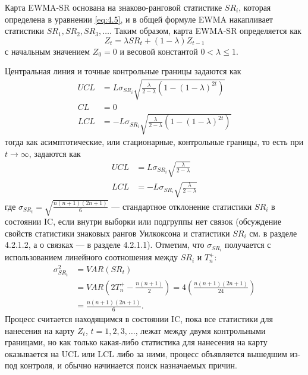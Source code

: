 Карта EWMA-SR основана на знаково-ранговой статистике \(SR_i\), которая определена в уравнении \eqref{eq:4.5}, и в общей формуле EWMA накапливает статистики \(SR_1, SR_2, SR_3, \ldots\). Таким образом, карта EWMA-SR определяется как
\begin{equation}
	Z_t = \lambda SR_t + (1 - \lambda) Z_{t-1}
	\label{eq:4.20}
\end{equation}
с начальным значением \(Z_0 = 0\) и весовой константой \(0 < \lambda \le 1\).

Центральная линия и точные контрольные границы задаются как
\begin{equation}
	\begin{aligned}
		UCL &= L\sigma_{SR_i}\sqrt{\frac{\lambda}{2 - \lambda} \left(1 - (1 - \lambda)^{2t}\right)} \\
		CL &= 0 \\
		LCL &= -L\sigma_{SR_i}\sqrt{\frac{\lambda}{2 - \lambda} \left(1 - (1 - \lambda)^{2t}\right)}
	\end{aligned}
	\label{eq:4.21}
\end{equation}
тогда как асимптотические, или стационарные, контрольные границы, то есть при \(t \to \infty\), задаются как
\begin{equation}
	\begin{aligned}
		UCL &= L\sigma_{SR_i}\sqrt{\frac{\lambda}{2 - \lambda}} \\
		LCL &= -L\sigma_{SR_i}\sqrt{\frac{\lambda}{2 - \lambda}}
	\end{aligned}
	\label{eq:4.22}
\end{equation}
где \(\sigma_{SR_t} = \sqrt{\frac{n(n + 1)(2n + 1)}{6}}\) --- стандартное отклонение статистики \(SR_i\) в состоянии IC, если внутри выборки или подгруппы нет связок (обсуждение свойств статистики знаковых рангов Уилкоксона и статистики \(SR_i\) см. в разделе 4.2.1.2, а о связках --- в разделе 4.2.1.1). Отметим, что \(\sigma_{SR_i}\) получается с использованием линейного соотношения между \(SR_i\) и \(T_n^+\):
\begin{align*}
	\sigma_{SR_t}^2 &= VAR(SR_t) \\
	&= VAR\left(2T_n^+ - \frac{n(n + 1)}{2}\right) = 4\left(\frac{n(n + 1)(2n + 1)}{24}\right) \\
	&= \frac{n(n + 1)(2n + 1)}{6}.
\end{align*}
Процесс считается находящимся в состоянии IC, пока все статистики для нанесения на карту \(Z_t\), \(t = 1, 2, 3, \ldots\), лежат между двумя контрольными границами, но как только какая-либо статистика для нанесения на карту оказывается на UCL или LCL либо за ними, процесс объявляется вышедшим из-под контроля, и обычно начинается поиск назначаемых причин.


